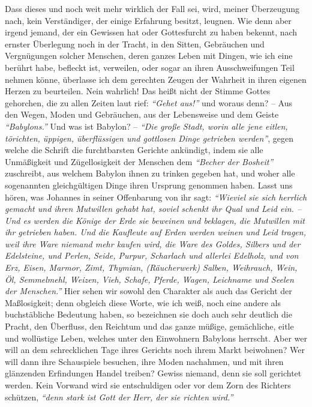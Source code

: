 Dass dieses und noch weit mehr wirklich der Fall sei, wird, meiner Überzeugung
nach, kein Verständiger, der einige Erfahrung besitzt, leugnen. Wie denn aber
irgend jemand, der ein Gewissen hat oder Gottesfurcht zu haben bekennt, nach
ernster Überlegung noch in der Tracht, in den Sitten, Gebräuchen und
Vergnügungen solcher Menschen, deren ganzes Leben mit Dingen, wie ich eine
berührt habe, befleckt ist, verweilen, oder sogar an ihren Ausschweifungen Teil
nehmen könne, überlasse ich dem gerechten Zeugen der Wahrheit in ihren eigenen
Herzen zu beurteilen. Nein wahrlich! Das heißt nicht der Stimme Gottes
gehorchen, die zu allen Zeiten laut rief: \textit{"`Gehet aus!"'} und woraus
denn? -- Aus den Wegen, Moden und Gebräuchen, aus der Lebensweise und dem Geiste
\textit{"`Babylons."'} Und was ist Babylon? --
\textit{"`Die große Stadt, worin alle jene eitlen,
törichten, üppigen, überflüssigen und gottlosen Dinge getrieben werden"'},
gegen
welche die Schrift die furchtbarsten Gerichte ankündigt,
indem sie alle
Unmäßigkeit und Zügellosigkeit der Menschen dem \textit{"`Becher der Bosheit"'}
zuschreibt,
aus welchem Babylon ihnen zu trinken gegeben hat, und woher alle sogenannten
gleichgültigen Dinge ihren Ursprung genommen haben.
Lasst uns hören, was Johannes in
seiner Offenbarung von ihr sagt:
\textit{"`Wieviel sie sich herrlich gemacht und ihren
Mutwillen gehabt hat, soviel schenkt ihr Qual und Leid ein. -- Und es werden die
Könige der Erde
sie beweinen und beklagen, die Mutwillen mit ihr getrieben
haben. Und die Kaufleute auf Erden werden weinen und Leid tragen, weil ihre
Ware niemand mehr kaufen wird, die Ware des Goldes, Silbers und der
Edelsteine, und Perlen, Seide, Purpur, Scharlach und allerlei
Edelholz, und von Erz,
Eisen, Marmor, Zimt, Thymian,
(Räucherwerk) Salben, Weihrauch, Wein, Öl, Semmelmehl,
Weizen, Vieh, Schafe, Pferde, Wagen, Leichname und Seelen der
Menschen."'}
Hier sehen wir sowohl den Charakter
als auch das Gericht der Maßlosigkeit; denn obgleich diese
Worte, wie ich weiß,
noch eine andere als buchstäbliche Bedeutung
haben, so
bezeichnen sie
doch auch
sehr deutlich die Pracht, den Überfluss, den Reichtum und das ganze müßige,
gemächliche, eitle und wollüstige Leben, welches unter den Einwohnern
Babylons
herrscht. Aber wer will an dem schrecklichen Tage ihres
Gerichts noch ihrem
Markt beiwohnen? Wer will dann ihre Schauspiele besuchen, ihre Moden nachahmen,
und mit ihren glänzenden Erfindungen Handel treiben? Gewiss niemand, denn sie
soll gerichtet werden. Kein Vorwand wird sie entschuldigen oder vor dem Zorn
des Richters schützen,
\textit{"`denn stark ist Gott der Herr, der sie richten
wird."'}


